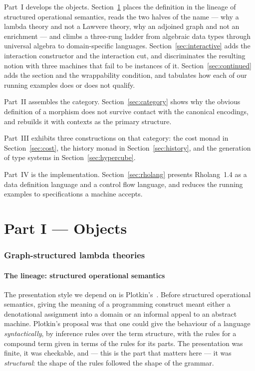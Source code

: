 \documentclass[11pt]{article}
\theoremstyle{definition}
\theoremstyle{plain}
\theoremstyle{remark}
\begin{document}
Part~I develops the objects. Section~\ref{sec:gslt} places the definition in the
lineage of structured operational semantics, reads the two halves of the name --- why a
lambda theory and not a Lawvere theory, why an adjoined graph and not an enrichment ---
and climbs a three-rung ladder from algebraic data types through universal algebra to
domain-specific languages.
Section~\ref{sec:interactive} adds the interaction constructor and the interaction cut,
and discriminates the resulting notion with three machines that fail to be instances of
it. Section~\ref{sec:continued} adds the section and the wrappability condition, and
tabulates how each of our running examples does or does not qualify.

Part~II assembles the category. Section~\ref{sec:category} shows why the obvious
definition of a morphism does not survive contact with the canonical encodings, and
rebuilds it with contexts as the primary structure.

Part~III exhibits three constructions on that category:
the cost monad in Section~\ref{sec:cost}, the history monad in Section~\ref{sec:history},
and the generation of type systems in Section~\ref{sec:hypercube}.

Part~IV is the implementation. Section~\ref{sec:rholang} presents Rholang~1.4 as a data
definition language and a control flow language, and reduces the running examples to
specifications a machine accepts.

\part*{Part I --- Objects}

\section{Graph-structured lambda theories}
\label{sec:gslt}

\subsection{The lineage: structured operational semantics}

The presentation style we depend on is Plotkin's~\cite{Plotkin1981,Plotkin2004}. Before
structured operational semantics, giving the meaning of a programming construct meant
either a denotational assignment into a domain or an informal appeal to an abstract
machine. Plotkin's proposal was that one could give the behaviour of a language
\emph{syntactically}, by inference rules over the term structure, with the rules for a
compound term given in terms of the rules for its parts. The presentation was finite,
it was checkable, and --- this is the part that matters here --- it was
\emph{structural}: the shape of the rules followed the shape of the grammar.
\end{document}
